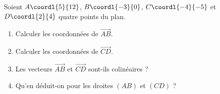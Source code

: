 \begin{exo}{}
	Soient $A\coordl{5}{12}$, $B\coordl{-3}{0}$, $C\coordl{-4}{-5}$ et $D\coordl{2}{4}$ quatre points du plan.

	\begin{enumerate}
		\item Calculer les coordonnées de $\vec{AB}$.
		\item Calculer les coordonnées de $\vec{CD}$.
		\item Les vecteurs $\vec{AB}$ et $\vec{CD}$ sont-ils colinéaires ?
		\item Qu'en déduit-on pour les droites $(AB)$ et $(CD)$ ?
	\end{enumerate}
\end{exo}
